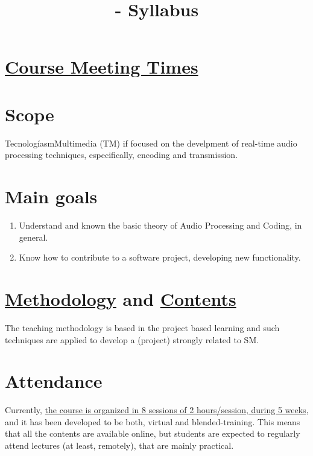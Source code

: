 

\title{\TM{} - Syllabus}

\maketitle

\section{\href{https://www.ual.es/estudios/grados/presentacion/plandeestudios/asignatura/4015/40154321}{Course Meeting Times}}

\section{Scope}
TecnologíasmMultimedia (TM) if focused on the develpment of real-time
audio processing techniques, especifically, encoding and transmission.

\section{Main goals}
\begin{enumerate}
\item Understand and known the basic theory of Audio Processing and Coding, in general.
\item Know how to contribute to a software project, developing new functionality.
\end{enumerate}

\section{\href{http://portafirma.ual.es/pfirma/downloadReport/file?idDocument=4u61Ie5es2&idRequest=ZeBY35LlFa}{Methodology} and \href{https://sistemas-multimedia.github.io/contents/}{Contents}}
The teaching methodology is based in the project based learning and
such techniques are applied to develop a
\href{https://github.com/Sistemas-Multimedia/VCF}(project) strongly
related to SM.

\section{Attendance}
Currently,
\href{https://www.ual.es/estudios/masteres/presentacion/plandeestudios/asignatura/7114/71142105}{the
  course is organized in 8 sessions of 2 hours/session, during 5
  weeks}, and it has been developed to be both, virtual and
blended-training. This means that all the contents are available
online, but students are expected to regularly attend lectures (at
least, remotely), that are mainly practical.

